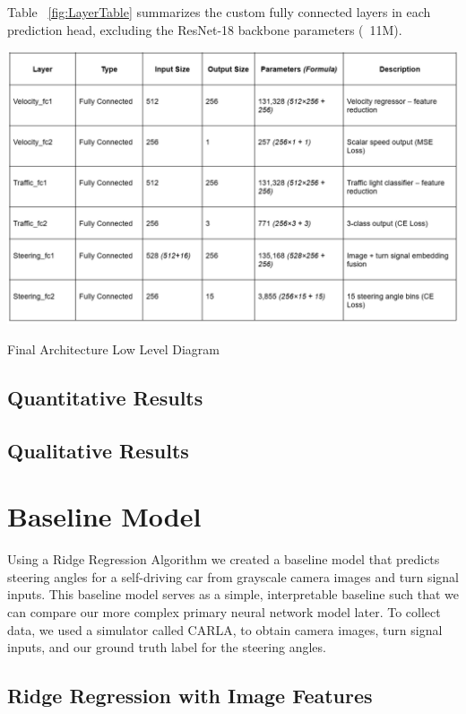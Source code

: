 \documentclass{article} %
\begin{document}
Table ~\ref{fig:LayerTable} summarizes the custom fully connected layers in each prediction head, excluding the ResNet-18 backbone parameters (~11M).

\begin{table}[H] %
    \centering
    \includegraphics[width=1.0\textwidth]{LayerTable.png} %
    \caption{Final Architecture Low Level Diagram}
    \label{fig:LayerTable}
\end{table}

\subsection{Quantitative Results}

\subsection{Qualitative Results}

\section{Baseline Model}

Using a Ridge Regression Algorithm we created a baseline model that predicts steering angles for a self-driving car 
from grayscale camera images and turn signal inputs. This baseline model serves as a simple, interpretable baseline
such that we can compare our more complex primary neural network model later. To collect data, we used a simulator
called CARLA, to obtain camera images, turn signal inputs, and our ground truth label for the steering angles.


\subsection{Ridge Regression with Image Features}
\end{document}
